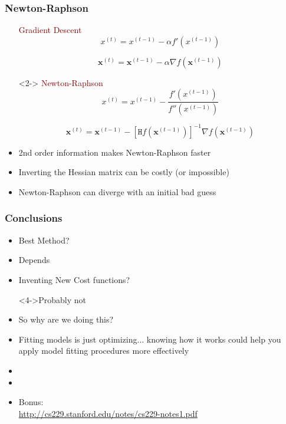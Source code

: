 \documentclass[xcolor={dvipsnames}]{beamer}
\begin{document}
\frame
{
\frametitle{Newton-Raphson}

\begin{itemize}
\item[] \textcolor{Maroon}{Gradient Descent}
$${ x^{(t)} = { x}^{(t-1)}} - \alpha f'\left({ x^{(t-1)}}\right)$$

$${\boldsymbol x^{(t)} = {\boldsymbol x}^{(t-1)}} - \alpha \nabla f\left({\boldsymbol x^{(t-1)}}\right)$$


\item[]<2-> \textcolor{Maroon}{Newton-Raphson}
$${ x^{(t)} = { x}^{(t-1)}} - \frac{f'\left(x^{(t-1)}\right)}{f''\left(x^{(t-1)}\right)}$$

$${\boldsymbol x^{(t)} = {\boldsymbol x}^{(t-1)}} -  \left[\texttt{H}f\left({\boldsymbol x^{(t-1)}}\right)\right]^{-1} \nabla f\left({\boldsymbol x^{(t-1)}}\right)$$


\item<4-> 2nd order information makes Newton-Raphson faster
\item<5-> Inverting the Hessian matrix can be costly (or impossible)
\item<6-> Newton-Raphson can diverge with an initial bad guess 
\item[]

\end{itemize}
}


\frame
{
\frametitle{Conclusions}

\begin{itemize}
\item Best Method?
\item<2->[]Depends
\item<3-> Inventing New Cost functions? 
\item[]<4->Probably not
\item<5-> So why are we doing this? 
\item<6->[] Fitting models is just optimizing... knowing how it works could help you apply model fitting procedures more effectively 
\item<6->[]
\item<6->[]
\item<7->[]Bonus: \\ \footnotesize
\url{http://cs229.stanford.edu/notes/cs229-notes1.pdf}
\end{itemize}
}
\end{document}
